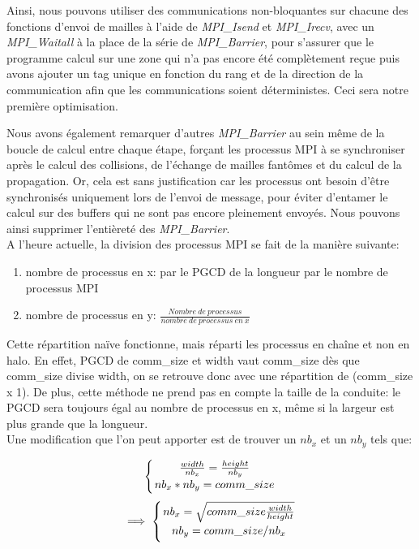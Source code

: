 Ainsi, nous pouvons utiliser des communications non-bloquantes sur chacune des fonctions d'envoi de mailles à l'aide de \textit{MPI\_Isend} et \textit{MPI\_Irecv}, avec un \textit{MPI\_Waitall} à la place de la série de \textit{MPI\_Barrier}, pour s'assurer que le programme calcul sur une zone qui n'a pas encore été complètement reçue puis avons ajouter un tag unique en fonction du rang et de la direction de la communication afin que les communications soient déterministes. Ceci sera notre première optimisation.

Nous avons également remarquer d'autres \textit{MPI\_Barrier} au sein même de la boucle de calcul entre chaque étape, forçant les processus MPI à se synchroniser après le calcul des collisions, de l'échange de mailles fantômes et du calcul de la propagation. Or, cela est sans justification car les processus ont besoin d'être synchronisés uniquement lors de l'envoi de message, pour éviter d'entamer le calcul sur des buffers qui ne sont pas encore pleinement envoyés. Nous pouvons ainsi supprimer l'entièreté des \textit{MPI\_Barrier}.\\

A l'heure actuelle, la division des processus MPI se fait de la manière suivante:
\begin{enumerate}
	\item nombre de processus en x: par le PGCD de la longueur par le nombre de processus MPI
	\item nombre de processus en y: $\tfrac{Nombre\ de\ processus}{nombre\ de\ processus\ en\ x}$
\end{enumerate}

 \vspace{0.1cm}
 Cette répartition naïve fonctionne, mais réparti les processus en chaîne et non en halo. En effet, PGCD de comm\_size et width vaut comm\_size dès que comm\_size divise width, on se retrouve donc avec une répartition de (comm\_size x 1). De plus, cette méthode ne prend pas en compte la taille de la conduite: le PGCD sera toujours égal au nombre de processus en x, même si la largeur est plus grande que la longueur.\\
 Une modification que l'on peut apporter est de trouver un $nb_{x}$ et un $nb_{y}$ tels que:

 $$\left\{{\frac{width}{nb_x}=\tfrac{height}{nb_y}\atop nb_x*nb_y=comm\_size}\right.$$
 $$\implies\left\{{nb_x=\sqrt{comm\_size\tfrac{width}{height}}\atop nb_y=comm\_size / nb_x}\right.$$
\\

